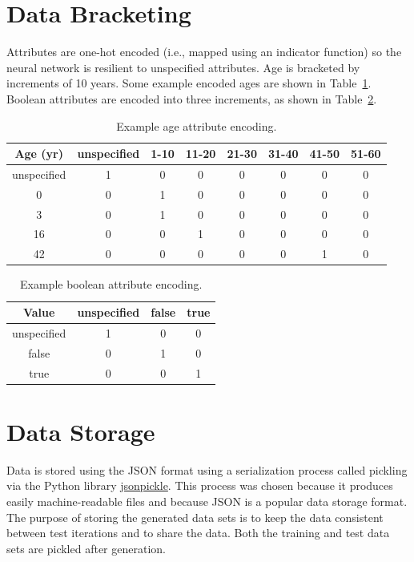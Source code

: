 \documentclass[]{report}
\begin{document}
\FloatBarrier
\section{Data Bracketing}
\label{sec:data-bracketing}

Attributes are one-hot encoded (i.e., mapped using an indicator function) so the neural network is
resilient to unspecified attributes. Age is bracketed by increments of 10 years. Some example
encoded ages are shown in Table~\ref{tab:example_age_attribute_encoding}. Boolean attributes are
encoded into three increments, as shown in Table~\ref{tab:example_boolean_attribute_encoding}.
    
\begin{table}[h]
    \centering
    \begin{tabular}{c|c|c|c|c|c|c|c}
        Age (yr) & unspecified & 1-10 & 11-20 & 21-30 & 31-40 & 41-50 & 51-60 \\\hline
        unspecified & 1 & 0 & 0 & 0 & 0 & 0 & 0 \\
        0 & 0 & 1 & 0 & 0 & 0 & 0 & 0 \\
        3 & 0 & 1 & 0 & 0 & 0 & 0 & 0 \\
        16 & 0 & 0 & 1 & 0 & 0 & 0 & 0 \\
        42 & 0 & 0 & 0 & 0 & 0 & 1 & 0
    \end{tabular}
    \caption{Example age attribute encoding.}
    \label{tab:example_age_attribute_encoding}
\end{table}

\begin{table}[h]
    \centering
    \begin{tabular}{c|c|c|c}
        Value & unspecified & false & true \\\hline
        unspecified & 1 & 0 & 0 \\
        false & 0 & 1 & 0 \\
        true & 0 & 0 & 1
    \end{tabular}
    \caption{Example boolean attribute encoding.}
    \label{tab:example_boolean_attribute_encoding}
\end{table}

\FloatBarrier
\section{Data Storage}

Data is stored using the JSON format using a serialization process called pickling via the Python
library \href{https://jsonpickle.github.io/}{jsonpickle}. This process was chosen because it
produces easily machine-readable files and because JSON is a popular data storage format. The
purpose of storing the generated data sets is to keep the data consistent between test iterations
and to share the data. Both the training and test data sets are pickled after generation.
\end{document}
